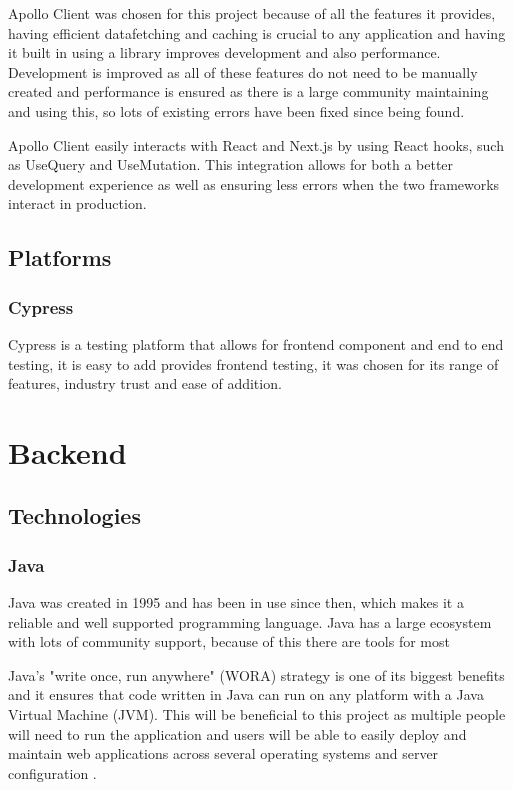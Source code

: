 \documentclass[]{project_report}
\begin{document}
Apollo Client was chosen for this project because of all the features it provides, having efficient datafetching and caching is crucial to any application and having it built in using a library improves development and also performance. Development is improved as all of these features do not need to be manually created and performance is ensured as there is a large community maintaining and using this, so lots of existing errors have been fixed since being found.

Apollo Client easily interacts with React and Next.js by using React hooks, such as UseQuery and UseMutation. This integration allows for both a better development experience as well as ensuring less errors when the two frameworks interact in production.

\subsection{Platforms}
\subsubsection{Cypress}

Cypress is a testing platform that allows for frontend component and end to end testing, it is easy to add provides frontend testing, it was chosen for its range of features, industry trust and ease of addition.

\section{Backend}
\subsection{Technologies}

\subsubsection{Java}

Java was created in 1995 and has been in use since then, which makes it a reliable and well supported programming language. Java has a large ecosystem with lots of community support, because of this there are tools for most

Java’s "write once, run anywhere" (WORA) strategy is one of its biggest benefits and it ensures that code written in Java can run on any platform with a Java Virtual Machine (JVM). This will be beneficial to this project as multiple people will need to run the application and users will be able to easily deploy and maintain web applications across several operating systems and server configuration \cite{java}. 
\end{document}
